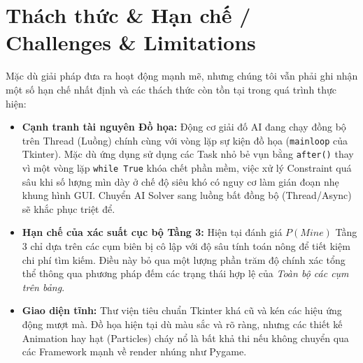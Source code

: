 \section{Thách thức \& Hạn chế / Challenges \& Limitations}

Mặc dù giải pháp đưa ra hoạt động mạnh mẽ, nhưng chúng tôi vẫn phải ghi nhận một số hạn chế nhất định và các thách thức còn tồn tại trong quá trình thực hiện:

\begin{itemize}
    \item \textbf{Cạnh tranh tài nguyên Đồ họa:} Động cơ giải đố AI đang chạy đồng bộ trên Thread (Luồng) chính cùng với vòng lặp sự kiện đồ họa (\texttt{mainloop} của Tkinter). Mặc dù ứng dụng sử dụng các Task nhỏ bẻ vụn bằng \texttt{after()} thay vì một vòng lặp \texttt{while True} khóa chết phần mềm, việc xử lý Constraint quá sâu khi số lượng mìn dày ở chế độ siêu khó có nguy cơ làm gián đoạn nhẹ khung hình GUI. Chuyển AI Solver sang luồng bất đồng bộ (Thread/Async) sẽ khắc phục triệt để.
    \item \textbf{Hạn chế của xác suất cục bộ Tầng 3:} Hiện tại đánh giá $P(Mine)$ Tầng 3 chỉ dựa trên các cụm biên bị cô lập với độ sâu tính toán nông để tiết kiệm chi phí tìm kiếm. Điều này bỏ qua một lượng phần trăm độ chính xác tổng thể thông qua phương pháp đếm các trạng thái hợp lệ của \textit{Toàn bộ các cụm trên bảng}.
    \item \textbf{Giao diện tĩnh:} Thư viện tiêu chuẩn Tkinter khá cũ và kén các hiệu ứng động mượt mà. Đồ họa hiện tại dù màu sắc và rõ ràng, nhưng các thiết kế Animation hay hạt (Particles) cháy nổ là bất khả thi nếu không chuyển qua các Framework mạnh về render nhúng như Pygame.
\end{itemize}
